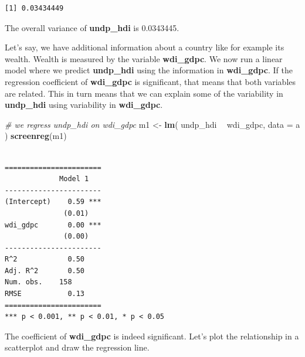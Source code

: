 \documentclass[]{article}
\newenvironment{Shaded}{\begin{snugshade}}{\end{snugshade}}
\newcommand{\KeywordTok}[1]{\textcolor[rgb]{0.13,0.29,0.53}{\textbf{#1}}}
\newcommand{\DataTypeTok}[1]{\textcolor[rgb]{0.13,0.29,0.53}{#1}}
\newcommand{\DecValTok}[1]{\textcolor[rgb]{0.00,0.00,0.81}{#1}}
\newcommand{\StringTok}[1]{\textcolor[rgb]{0.31,0.60,0.02}{#1}}
\newcommand{\CommentTok}[1]{\textcolor[rgb]{0.56,0.35,0.01}{\textit{#1}}}
\newcommand{\OperatorTok}[1]{\textcolor[rgb]{0.81,0.36,0.00}{\textbf{#1}}}
\newcommand{\NormalTok}[1]{#1}
\theoremstyle{definition}
\theoremstyle{definition}
\theoremstyle{definition}
\theoremstyle{remark}
\begin{document}
\begin{verbatim}
[1] 0.03434449
\end{verbatim}

The overall variance of \textbf{undp\_hdi} is 0.0343445.

Let's say, we have additional information about a country like for
example its wealth. Wealth is measured by the variable
\textbf{wdi\_gdpc}. We now run a linear model where we predict
\textbf{undp\_hdi} using the information in \textbf{wdi\_gdpc}. If the
regression coefficient of \textbf{wdi\_gdpc} is significant, that means
that both variables are related. This in turn means that we can explain
some of the variability in \textbf{undp\_hdi} using variability in
\textbf{wdi\_gdpc}.

\begin{Shaded}
\begin{Highlighting}[]
\CommentTok{# we regress undp_hdi on wdi_gdpc}
\NormalTok{m1 <-}\StringTok{ }\KeywordTok{lm}\NormalTok{( undp_hdi }\OperatorTok{~}\StringTok{ }\NormalTok{wdi_gdpc, }\DataTypeTok{data =}\NormalTok{ a )}
\KeywordTok{screenreg}\NormalTok{(m1)}
\end{Highlighting}
\end{Shaded}

\begin{verbatim}

=======================
             Model 1   
-----------------------
(Intercept)    0.59 ***
              (0.01)   
wdi_gdpc       0.00 ***
              (0.00)   
-----------------------
R^2            0.50    
Adj. R^2       0.50    
Num. obs.    158       
RMSE           0.13    
=======================
*** p < 0.001, ** p < 0.01, * p < 0.05
\end{verbatim}

The coefficient of \textbf{wdi\_gdpc} is indeed significant. Let's plot
the relationship in a scatterplot and draw the regression line.

\begin{Shaded}
\end{Shaded}
\end{document}

